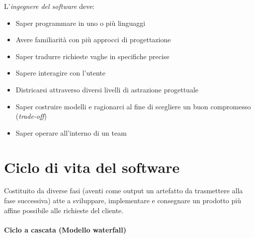 \newpage

L'\textit{ingegnere del software} deve:
\begin{itemize}
    \item Saper programmare in uno o più linguaggi
    \item Avere familiarità con più approcci di progettazione
    \item Saper tradurre richieste vaghe in specifiche precise
    \item Sapere interagire con l'utente
    \item Districarsi attraverso diversi livelli di astrazione progettuale
    \item Saper costruire modelli e ragionarci al fine di scegliere un buon compromesso (\textit{trade-off})
    \item Saper operare all'interno di un team
\end{itemize}

\section{Ciclo di vita del software}
Costituito da diverse fasi (aventi come output un artefatto da trasmettere alla fase successiva) atte a sviluppare, implementare e consegnare un prodotto più affine possibile alle richieste del cliente.

\paragraph{Ciclo a cascata (Modello waterfall)}

